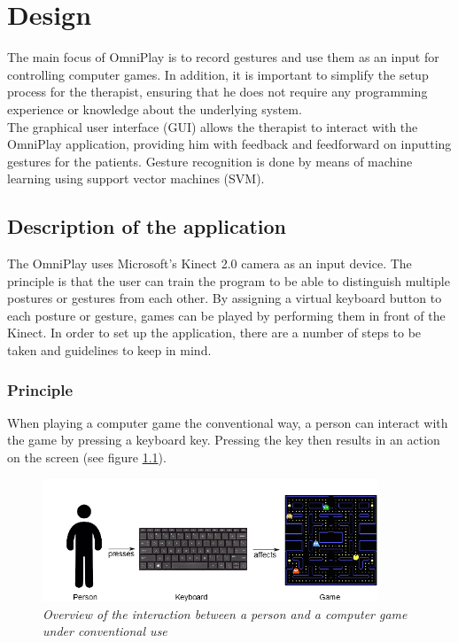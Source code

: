 \chapter{Design}
\label{chapter: design}

The main focus of OmniPlay is to record gestures and use them as an input for controlling computer games. In addition, it is important to simplify the setup process for the therapist, ensuring that he does not require any programming experience or knowledge about the underlying system.\\

The graphical user interface (GUI) allows the therapist to interact with the OmniPlay application, providing him with feedback and feedforward on inputting gestures for the patients. Gesture recognition is done by means of machine learning using support vector machines (SVM).


\section{Description of the application}

The OmniPlay uses Microsoft's Kinect 2.0 camera as an input device. The principle is that the user can train the program to be able to distinguish multiple postures or gestures from each other. By assigning a virtual keyboard button to each posture or gesture, games can be played by performing them in front of the Kinect. In order to set up the application, there are a number of steps to be taken and guidelines to keep in mind.


\subsection{Principle}

When playing a computer game the conventional way, a person can interact with the game by pressing a keyboard key. Pressing the key then results in an action on the screen (see figure \ref{fig: overview_basic_interaction}).\\

\begin{figure}[H]
\begin{center}
\includegraphics[width=10cm]{Concept1.png}
\caption{\emph{Overview of the interaction between a person and a computer game under conventional use}}
\label{fig: overview_basic_interaction}
\end{center}
\end{figure}

